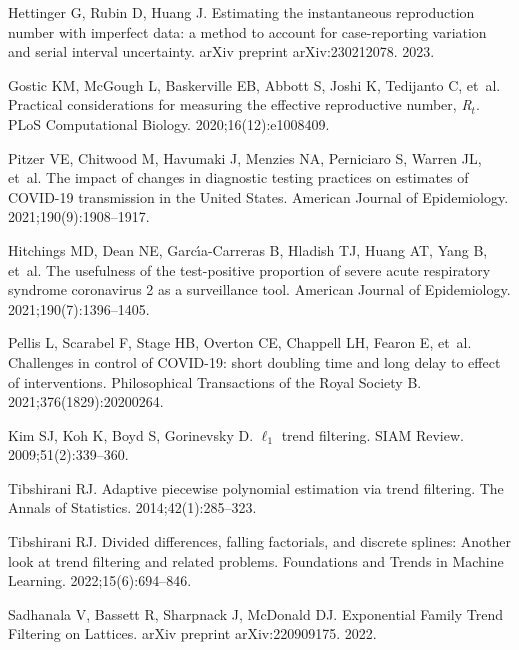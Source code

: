 \documentclass[10pt,letterpaper]{article}
\begin{document}
\begin{thebibliography}{10}
  Hettinger G, Rubin D, Huang J.
  \newblock Estimating the instantaneous reproduction number with imperfect data:
    a method to account for case-reporting variation and serial interval
    uncertainty.
  \newblock arXiv preprint arXiv:230212078. 2023.
  
  Gostic KM, McGough L, Baskerville EB, Abbott S, Joshi K, Tedijanto C, et~al.
  \newblock Practical considerations for measuring the effective reproductive
    number, \emph{R}$_t$.
  \newblock PLoS Computational Biology. 2020;16(12):e1008409.
  
  Pitzer VE, Chitwood M, Havumaki J, Menzies NA, Perniciaro S, Warren JL, et~al.
  \newblock The impact of changes in diagnostic testing practices on estimates of
    {COVID-19} transmission in the {U}nited {S}tates.
  \newblock American Journal of Epidemiology. 2021;190(9):1908--1917.
  
  Hitchings MD, Dean NE, Garc{\'\i}a-Carreras B, Hladish TJ, Huang AT, Yang B,
    et~al.
  \newblock The usefulness of the test-positive proportion of severe acute
    respiratory syndrome coronavirus 2 as a surveillance tool.
  \newblock American Journal of Epidemiology. 2021;190(7):1396--1405.
  
  Pellis L, Scarabel F, Stage HB, Overton CE, Chappell LH, Fearon E, et~al.
  \newblock Challenges in control of {COVID-19}: short doubling time and long
    delay to effect of interventions.
  \newblock Philosophical Transactions of the Royal Society B.
    2021;376(1829):20200264.
  
  Kim SJ, Koh K, Boyd S, Gorinevsky D.
  \newblock $\ell_1$ trend filtering.
  \newblock SIAM Review. 2009;51(2):339--360.
  
  Tibshirani RJ.
  \newblock Adaptive piecewise polynomial estimation via trend filtering.
  \newblock The Annals of Statistics. 2014;42(1):285--323.
  
  Tibshirani RJ.
  \newblock Divided differences, falling factorials, and discrete splines:
    Another look at trend filtering and related problems.
  \newblock Foundations and Trends{\textregistered} in Machine Learning.
    2022;15(6):694--846.
  
  Sadhanala V, Bassett R, Sharpnack J, McDonald DJ.
  \newblock Exponential Family Trend Filtering on Lattices.
  \newblock arXiv preprint arXiv:220909175. 2022.
  

\end{thebibliography}
\end{document}
